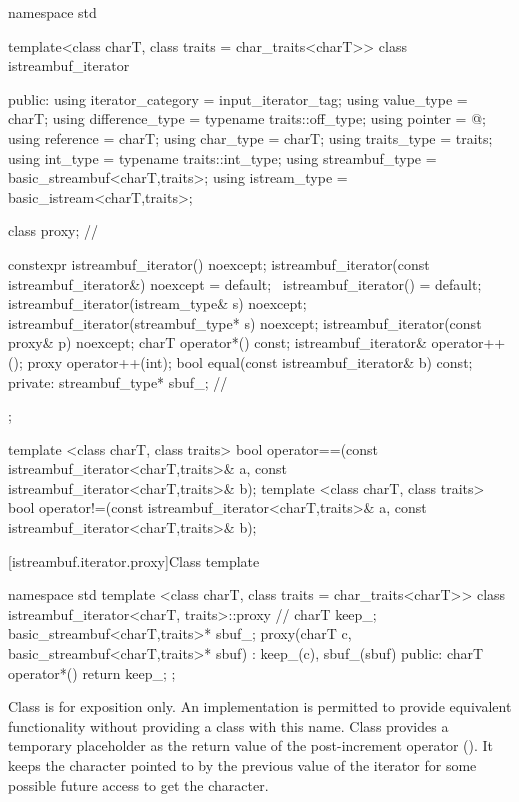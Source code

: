 %
\begin{codeblock}
namespace std {
  template<class charT, class traits = char_traits<charT>>
  class istreambuf_iterator {
  public:
    using iterator_category = input_iterator_tag;
    using value_type        = charT;
    using difference_type   = typename traits::off_type;
    using pointer           = @\unspec@;
    using reference         = charT;
    using char_type         = charT;
    using traits_type       = traits;
    using int_type          = typename traits::int_type;
    using streambuf_type    = basic_streambuf<charT,traits>;
    using istream_type      = basic_istream<charT,traits>;

    class proxy;                          // \expos

    constexpr istreambuf_iterator() noexcept;
    istreambuf_iterator(const istreambuf_iterator&) noexcept = default;
    ~istreambuf_iterator() = default;
    istreambuf_iterator(istream_type& s) noexcept;
    istreambuf_iterator(streambuf_type* s) noexcept;
    istreambuf_iterator(const proxy& p) noexcept;
    charT operator*() const;
    istreambuf_iterator& operator++();
    proxy operator++(int);
    bool equal(const istreambuf_iterator& b) const;
  private:
    streambuf_type* sbuf_;                // \expos
  };

  template <class charT, class traits>
    bool operator==(const istreambuf_iterator<charT,traits>& a,
            const istreambuf_iterator<charT,traits>& b);
  template <class charT, class traits>
    bool operator!=(const istreambuf_iterator<charT,traits>& a,
            const istreambuf_iterator<charT,traits>& b);
}
\end{codeblock}

[istreambuf.iterator.proxy]{Class template }

%
\begin{codeblock}
namespace std {
  template <class charT, class traits = char_traits<charT>>
  class istreambuf_iterator<charT, traits>::proxy { // \expos
    charT keep_;
    basic_streambuf<charT,traits>* sbuf_;
    proxy(charT c, basic_streambuf<charT,traits>* sbuf)
      : keep_(c), sbuf_(sbuf) { }
  public:
    charT operator*() { return keep_; }
  };
}
\end{codeblock}

\pnum
Class
is for exposition only.
An implementation is permitted to provide equivalent functionality without
providing a class with this name.
Class
provides a temporary
placeholder as the return value of the post-increment operator
().
It keeps the character pointed to by the previous value
of the iterator for some possible future access to get the character.

